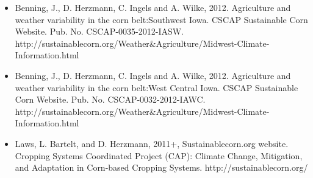 \begin{itemize}
\item Benning, J., D. Herzmann, C. Ingels and A. Wilke, 2012. Agriculture and weather variability in the corn belt:Southwest Iowa. CSCAP Sustainable Corn Website. Pub. No. CSCAP-0035-2012-IASW. http://sustainablecorn.org/Weather\&Agriculture/Midwest-Climate-Information.html

\item Benning, J., D. Herzmann, C. Ingels and A. Wilke, 2012. Agriculture and weather variability in the corn belt:West Central Iowa. CSCAP Sustainable Corn Website. Pub. No. CSCAP-0032-2012-IAWC. http://sustainablecorn.org/Weather\&Agriculture/Midwest-Climate-Information.html
\item Laws, L. Bartelt, and D. Herzmann, 2011+, Sustainablecorn.org website. Cropping Systems Coordinated Project (CAP): Climate Change, Mitigation, and Adaptation in Corn-based Cropping Systems. http://sustainablecorn.org/
\end{itemize}

